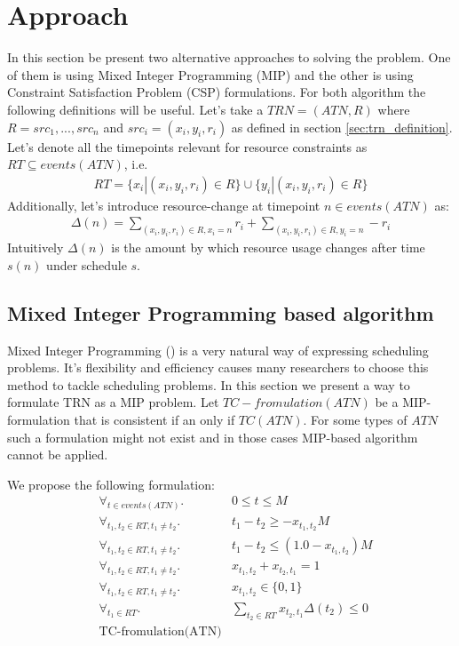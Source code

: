 \section{Approach}
In this section be present two alternative approaches to solving the problem. One of them is using Mixed Integer Programming (MIP) and the other is using Constraint Satisfaction Problem (CSP) formulations. For both algorithm the following definitions will be useful.
Let's take a $TRN=(ATN, R)$ where $R={src_1, ..., src_n}$ and $src_i = (x_i, y_i, r_i)$ as defined in section \ref{sec:trn_definition}. Let's denote all the timepoints relevant for resource constraints as $RT \subseteq events(ATN)$, i.e.
\begin{align*}
RT = \{ x_i | (x_i, y_i, r_i) \in R \} \cup \{ y_i | (x_i, y_i, r_i) \in R \}
\end{align*}
Additionally, let's introduce resource-change at timepoint $n \in events(ATN)$ as:
\begin{align*}
\Delta(n) = \sum_{(x_i, y_i, r_i) \in R, x_i = n} r_i + \sum_{(x_i, y_i, r_i) \in R, y_i = n} -r_i
\end{align*}
Intuitively $\Delta(n)$ is the amount by which resource usage changes after time $s(n)$ under schedule $s$.
\subsection{Mixed Integer Programming based algorithm}
Mixed Integer Programming (\cite{markowitz1957solution}) is a very natural way of expressing scheduling problems. It's flexibility and efficiency causes many researchers to choose this method to tackle scheduling problems. In this section we present a way to formulate TRN as a MIP problem.  Let $TC-fromulation(ATN)$ be a MIP-formulation that is consistent if an only if $TC(ATN)$. For some types of $ATN$ such a formulation might not exist and in those cases MIP-based algorithm cannot be applied.

We propose the following formulation:
\begin{align}
\label{eq:mip0} & \forall_{t \in events(ATN)}.              & 0 \leq t \leq M \\
\label{eq:mip1} & \forall_{t_1, t_2 \in RT, t_1 \neq t_2}. & t_1 - t_2 \geq - x_{t_1,t_2} M \\
\label{eq:mip2} & \forall_{t_1, t_2 \in RT, t_1 \neq t_2}. & t_1 - t_2 \leq (1.0 - x_{t_1,t_2}) M\\
\label{eq:mip3} & \forall_{t_1, t_2 \in RT, t_1 \neq t_2}. & x_{t_1,t_2} + x_{t_2,t_1}  = 1\\
\label{eq:mip4} & \forall_{t_1, t_2 \in RT, t_1 \neq t_2}. & x_{t_1,t_2} \in \{ 0, 1 \} \\
\label{eq:mip5} & \forall_{t_1 \in RT}.                    & \sum_{t_2 \in RT} x_{t_2, t_1} \Delta(t_2) \leq 0\\
\label{eq:mip6} & \text{TC-fromulation(ATN)}
\end{align}

